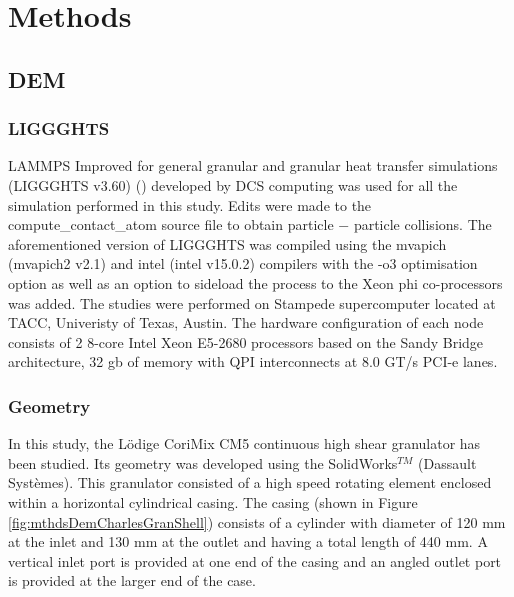 \documentclass[preprint,11pt,authoryear]{elsarticle}
\begin{document}
\section{Methods}

\subsection{DEM}
\subsubsection{LIGGGHTS}
\par LAMMPS Improved for general granular and granular heat transfer simulations (LIGGGHTS v3.60) 
(\cite{Kloss2012}) developed by DCS computing was used for all the simulation performed in this 
study. Edits were made to the compute\_contact\_atom source file to obtain particle $-$ particle 
collisions. The aforementioned version of LIGGGHTS was compiled using the mvapich (mvapich2 v2.1) 
and intel (intel v15.0.2) compilers with the -o3 optimisation option as well as an option to sideload the 
process to the Xeon phi co-processors was added. The studies were performed on Stampede 
supercomputer located at TACC, Univeristy of Texas, Austin. The hardware configuration of each node 
consists of 2 8-core Intel Xeon E5-2680 processors based on the Sandy Bridge architecture, 32 gb of 
memory with QPI interconnects at 8.0 GT/s PCI-e lanes.


\subsubsection{Geometry}    

\par In this study, the L\"{o}dige CoriMix CM5 continuous high shear granulator has been studied. Its 
geometry was developed using the SolidWorks$^{TM}$ (Dassault Syst\`{e}mes). This granulator 
consisted of a high speed rotating element enclosed within a horizontal cylindrical casing. The casing 
(shown in Figure \ref{fig:mthdsDemCharlesGranShell}) consists of a cylinder with diameter of 120 mm 
at the inlet and 130 mm at the outlet and having a total length of 440 mm. A vertical inlet port is 
provided at one end of the casing and an angled outlet port is provided at the larger end of the case. 
\end{document}
